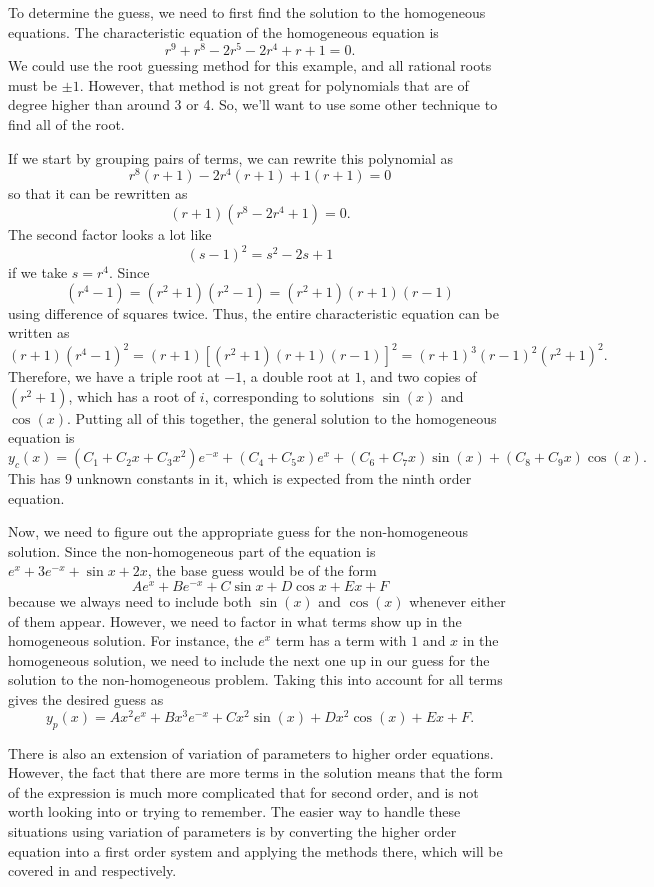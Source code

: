 \begin{exampleSol}
To determine the guess, we need to first find the solution to the homogeneous equations. The characteristic equation of the homogeneous equation is
\[ r^9 + r^8 - 2r^5 - 2r^4 + r + 1 = 0. \] We could use the root guessing method for this example, and all rational roots must be $\pm 1$. However, that method is not great for polynomials that are of degree higher than around 3 or 4. So, we'll want to use some other technique to find all of the root.

If we start by grouping pairs of terms, we can rewrite this polynomial as
\[ r^8(r+1) - 2r^4(r+1) + 1 (r+1) = 0 \] so that it can be rewritten as 
\[ (r+1)(r^8 - 2r^4 + 1) = 0.\] The second factor looks a lot like
\[ (s-1)^2 = s^2 - 2s +1 \] if we take $s = r^4$. Since 
\[ (r^4 - 1) = (r^2 + 1)(r^2 - 1) = (r^2 + 1)(r+1)(r-1) \] using difference of squares twice. Thus, the entire characteristic equation can be written as
\[ (r+1)(r^4-1)^2 = (r+1)[(r^2 + 1)(r+1)(r-1)]^2 = (r+1)^3(r-1)^2(r^2 + 1)^2. \]
Therefore, we have a triple root at $-1$, a double root at $1$, and two copies of $(r^2 + 1)$, which has a root of $i$, corresponding to solutions $\sin(x)$ and $\cos(x)$. Putting all of this together, the general solution to the homogeneous equation is
\[ y_c(x) = (C_1 + C_2x + C_3x^2)e^{-x} + (C_4 + C_5x)e^{x} + (C_6 + C_7x)\sin(x) + (C_8 + C_9x)\cos(x) .\] This has $9$ unknown constants in it, which is expected from the ninth order equation. 

Now, we need to figure out the appropriate guess for the non-homogeneous solution. Since the non-homogeneous part of the equation is $e^{x} + 3e^{-x} + \sin{x} +2x$, the base guess would be of the form
\[ Ae^x + Be^{-x} + C\sin{x} + D\cos{x} + Ex + F \] because we always need to include both $\sin(x)$ and $\cos(x)$ whenever either of them appear. However, we need to factor in what terms show up in the homogeneous solution. For instance, the $e^x$ term has a term with $1$ and $x$ in the homogeneous solution, we need to include the next one up in our guess for the solution to the non-homogeneous problem. Taking this into account for all terms gives the desired guess as 
\[ y_p(x) = Ax^2e^{x} + Bx^3e^{-x} + Cx^2\sin(x) + Dx^2\cos(x) + Ex + F.\]
\end{exampleSol}

There is also an extension of variation of parameters to higher order equations. However, the fact that there are more terms in the solution means that the form of the expression is much more complicated that for second order, and is not worth looking into or trying to remember. The easier way to handle these situations using variation of parameters is by converting the higher order equation into a first order system and applying the methods there, which will be covered in  and  respectively. 

